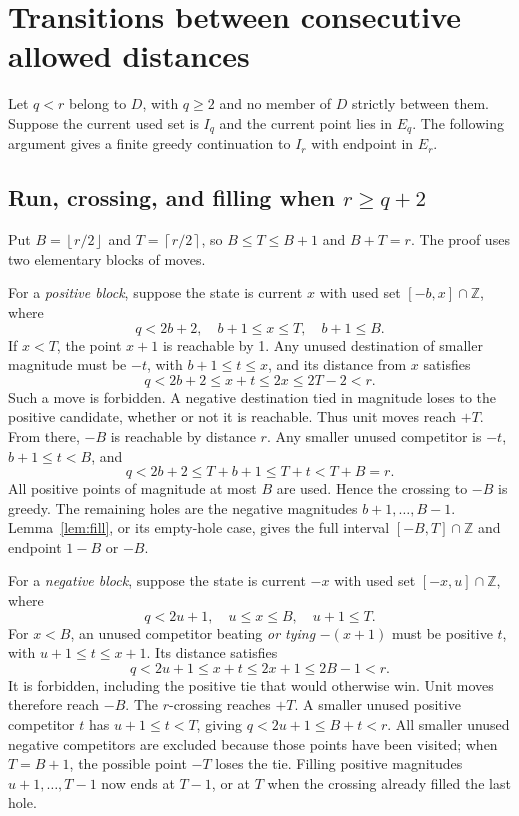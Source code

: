 \documentclass[11pt,a4paper]{article}
\newcommand{\Z}{\mathbb Z}\newcommand{\N}{\mathbb N}
\newcommand{\floor}[1]{\left\lfloor #1\right\rfloor}
\newcommand{\ceil}[1]{\left\lceil #1\right\rceil}
\begin{document}
\section{Transitions between consecutive allowed distances}
Let $q<r$ belong to $D$, with $q\ge2$ and no member of $D$ strictly between
them. Suppose the current used set is $I_q$ and the current point lies in
$E_q$. The following argument gives a finite greedy continuation to $I_r$
with endpoint in $E_r$.

\subsection{Run, crossing, and filling when \texorpdfstring{$r\ge q+2$}{r >= q+2}}
Put $B=\floor{r/2}$ and $T=\ceil{r/2}$, so $B\le T\le B+1$ and
$B+T=r$. The proof uses two elementary blocks of moves.

For a \emph{positive block}, suppose the state is current $x$ with used
set $[-b,x]\cap\Z$, where
\[
 q<2b+2,\quad b+1\le x\le T,\quad b+1\le B.
\]
If $x<T$, the point $x+1$ is reachable by 1. Any unused destination of
smaller magnitude must be $-t$, with $b+1\le t\le x$, and its distance
from $x$ satisfies
\[
 q<2b+2\le x+t\le2x\le2T-2<r.
\]
Such a move is forbidden. A negative destination tied in magnitude loses
to the positive candidate, whether or not it is reachable. Thus unit
moves reach $+T$. From there, $-B$ is reachable by distance $r$. Any
smaller unused competitor is $-t$, $b+1\le t<B$, and
\[
 q<2b+2\le T+b+1\le T+t<T+B=r.
\]
All positive points of magnitude at most $B$ are used. Hence the crossing
to $-B$ is greedy. The remaining holes are the negative magnitudes
$b+1,\ldots,B-1$. Lemma~\ref{lem:fill}, or its empty-hole case, gives
the full interval $[-B,T]\cap\Z$ and endpoint $1-B$ or $-B$.

For a \emph{negative block}, suppose the state is current $-x$ with used
set $[-x,u]\cap\Z$, where
\[
 q<2u+1,\quad u\le x\le B,\quad u+1\le T.
\]
For $x<B$, an unused competitor beating \emph{or tying} $-(x+1)$ must
be positive $t$, with $u+1\le t\le x+1$. Its distance satisfies
\[
 q<2u+1\le x+t\le2x+1\le2B-1<r.
\]
It is forbidden, including the positive tie that would otherwise win.
Unit moves therefore reach $-B$. The $r$-crossing reaches $+T$. A smaller
unused positive competitor $t$ has $u+1\le t<T$, giving
$q<2u+1\le B+t<r$. All smaller unused negative competitors are excluded
because those points have been visited; when $T=B+1$, the possible point
$-T$ loses the tie.
Filling positive magnitudes $u+1,\ldots,T-1$ now ends at $T-1$, or at
$T$ when the crossing already filled the last hole.
\end{document}
